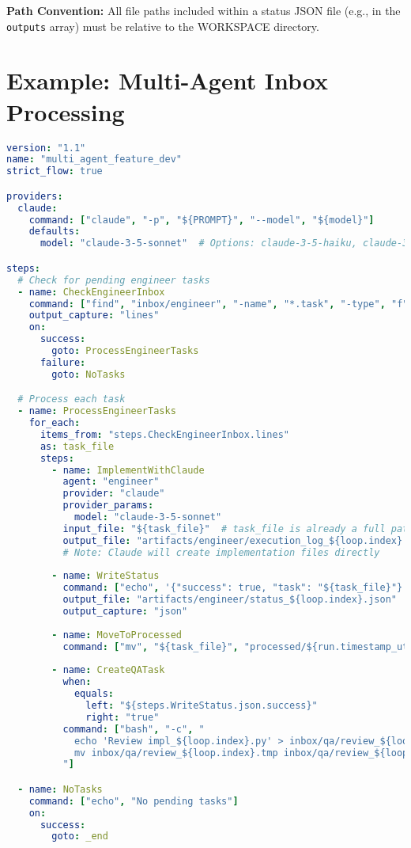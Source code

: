 \documentclass[11pt,a4paper]{article}
\begin{document}
\textbf{Path Convention:} All file paths included within a status JSON file (e.g., in the \texttt{outputs} array) must be relative to the WORKSPACE directory.

\section{Example: Multi-Agent Inbox Processing}

\begin{lstlisting}[language=yaml, caption={Multi-Agent Feature Development Workflow}]
version: "1.1"
name: "multi_agent_feature_dev"
strict_flow: true

providers:
  claude:
    command: ["claude", "-p", "${PROMPT}", "--model", "${model}"]
    defaults:
      model: "claude-3-5-sonnet"  # Options: claude-3-5-haiku, claude-3-opus-latest

steps:
  # Check for pending engineer tasks
  - name: CheckEngineerInbox
    command: ["find", "inbox/engineer", "-name", "*.task", "-type", "f"]
    output_capture: "lines"
    on:
      success:
        goto: ProcessEngineerTasks
      failure:
        goto: NoTasks

  # Process each task
  - name: ProcessEngineerTasks
    for_each:
      items_from: "steps.CheckEngineerInbox.lines"
      as: task_file
      steps:
        - name: ImplementWithClaude
          agent: "engineer"
          provider: "claude"
          provider_params:
            model: "claude-3-5-sonnet"
          input_file: "${task_file}"  # task_file is already a full path from find
          output_file: "artifacts/engineer/execution_log_${loop.index}.md"
          # Note: Claude will create implementation files directly
          
        - name: WriteStatus
          command: ["echo", '{"success": true, "task": "${task_file}"}']
          output_file: "artifacts/engineer/status_${loop.index}.json"
          output_capture: "json"
          
        - name: MoveToProcessed
          command: ["mv", "${task_file}", "processed/${run.timestamp_utc}_${loop.index}/"]
          
        - name: CreateQATask
          when:
            equals:
              left: "${steps.WriteStatus.json.success}"
              right: "true"
          command: ["bash", "-c", "
            echo 'Review impl_${loop.index}.py' > inbox/qa/review_${loop.index}.tmp &&
            mv inbox/qa/review_${loop.index}.tmp inbox/qa/review_${loop.index}.task
          "]

  - name: NoTasks
    command: ["echo", "No pending tasks"]
    on:
      success:
        goto: _end
\end{lstlisting}
\end{document}
